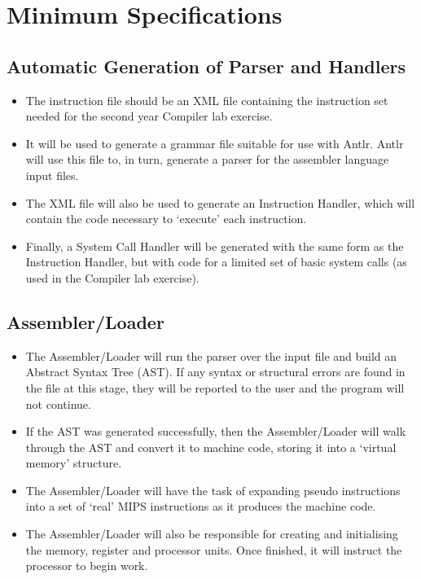 \documentclass[12pt]{report}
\begin{document}
\chapter{Minimum Specifications}

\section{Automatic Generation of Parser and Handlers}


\begin{itemize}

\item The instruction file should be an XML file containing the instruction set needed for the second year Compiler lab exercise.

\item It will be used to generate a grammar file suitable for use with Antlr.  Antlr will use this file to, in turn, generate a parser for the assembler language input files.

\item The XML file will also be used to generate an Instruction Handler, which will contain the code necessary to `execute' each instruction.

\item Finally, a System Call Handler will be generated with the same form as the Instruction Handler, but with code for a limited set of basic system calls (as used in the Compiler lab exercise).

\end{itemize}



\section{Assembler/Loader}

\begin{itemize}

\item The Assembler/Loader will run the parser over the input file and build an Abstract Syntax Tree (AST).  If any syntax or structural errors are found in the file at this stage, they will be reported to the user and the program will not continue.

\item If the AST was generated successfully, then the Assembler/Loader will walk through the AST and convert it to machine code, storing it into a `virtual memory' structure.

\item The Assembler/Loader will have the task of expanding pseudo instructions into a set of `real' MIPS instructions as it produces the machine code.

\item The Assembler/Loader will also be responsible for creating and initialising the memory, register and processor units. Once finished, it will instruct the processor to begin work.

\end{itemize}
\end{document}
